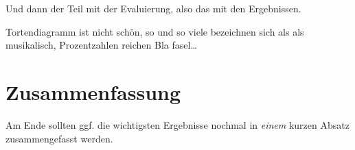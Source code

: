 Und dann der Teil mit der Evaluierung, also das mit den Ergebnissen.

Tortendiagramm ist nicht sch{\"o}n, so und so viele bezeichnen sich als als musikalisch, Prozentzahlen reichen 
Bla fasel\ldots

\section{Zusammenfassung}
\label{ch:Entwurf:sec:zusammenfassung}

Am Ende sollten ggf. die wichtigsten Ergebnisse nochmal in \emph{einem}
kurzen Absatz zusammengefasst werden.

